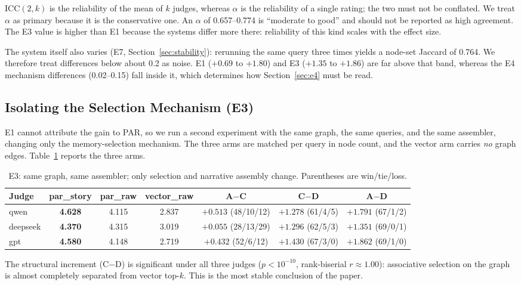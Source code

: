 \documentclass[11pt]{article}
\begin{document}
$\mathrm{ICC}(2,k)$ is the reliability of the mean of $k$ judges, whereas $\alpha$ is the
reliability of a single rating; the two must not be conflated. We treat $\alpha$ as primary
because it is the conservative one. An $\alpha$ of 0.657--0.774 is ``moderate to good'' and
should not be reported as high agreement. The E3 value is higher than E1 because the systems
differ more there: reliability of this kind scales with the effect size.

The system itself also varies (E7, Section~\ref{sec:stability}): rerunning the same query three
times yields a node-set Jaccard of 0.764. We therefore treat differences below about 0.2 as
noise. E1 ($+0.69$ to $+1.80$) and E3 ($+1.35$ to $+1.86$) are far above that band, whereas the
E4 mechanism differences (0.02--0.15) fall inside it, which determines how
Section~\ref{sec:e4} must be read.

\subsection{Isolating the Selection Mechanism (E3)}
\label{sec:e3}

E1 cannot attribute the gain to PAR, so we run a second experiment with the same graph, the same
queries, and the same assembler, changing only the memory-selection mechanism. The three arms
are matched per query in node count, and the vector arm carries \emph{no} graph edges.
Table~\ref{tab:e3} reports the three arms.

\begin{table}[t]
  \centering
  \small
  \begin{tabular}{@{}lcccccc@{}}
    \toprule
    Judge & par\_story & par\_raw & vector\_raw & A$-$C & C$-$D & A$-$D \\
    \midrule
    qwen & \textbf{4.628} & 4.115 & 2.837 & $+0.513$ (48/10/12) & $+1.278$ (61/4/5) & $+1.791$ (67/1/2) \\
    deepseek & \textbf{4.370} & 4.315 & 3.019 & $+0.055$ (28/13/29) & $+1.296$ (62/5/3) & $+1.351$ (69/0/1) \\
    gpt & \textbf{4.580} & 4.148 & 2.719 & $+0.432$ (52/6/12) & $+1.430$ (67/3/0) & $+1.862$ (69/1/0) \\
    \bottomrule
  \end{tabular}
  \caption{E3: same graph, same assembler; only selection and narrative assembly change.
  Parentheses are win/tie/loss.}\label{tab:e3}
\end{table}

The structural increment (C$-$D) is significant under all three judges ($p<10^{-10}$,
rank-biserial $r\approx1.00$): associative selection on the graph is almost completely separated
from vector top-$k$. This is the most stable conclusion of the paper.
\end{document}
